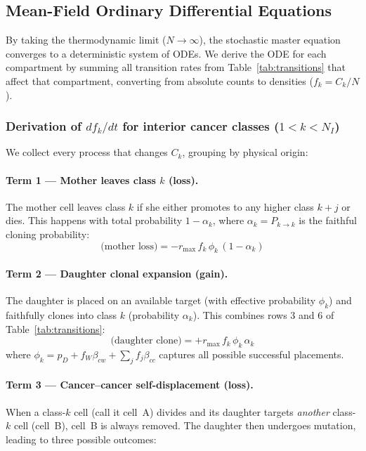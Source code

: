 \documentclass[11pt,a4paper]{article}
\begin{document}
\subsection{Mean-Field Ordinary Differential Equations}

By taking the thermodynamic limit ($N \to \infty$), the stochastic master equation converges to a deterministic system of ODEs. We derive the ODE for each compartment by summing all transition rates from Table~\ref{tab:transitions} that affect that compartment, converting from absolute counts to densities ($f_k = C_k/N$).

\subsubsection*{Derivation of $df_k/dt$ for interior cancer classes ($1 < k < N_I$)}

We collect every process that changes $C_k$, grouping by physical origin:

\paragraph{Term 1 --- Mother leaves class $k$ (loss).} The mother cell leaves class $k$ if she either promotes to any higher class $k+j$ or dies. This happens with total probability $1 - \alpha_k$, where $\alpha_k = P_{k \to k}$ is the faithful cloning probability:
\begin{equation}
    \text{(mother loss)} = -r_{\text{max}}\, f_k\, \phi_k\, (1 - \alpha_k)
\end{equation}

\paragraph{Term 2 --- Daughter clonal expansion (gain).} The daughter is placed on an available target (with effective probability $\phi_k$) and faithfully clones into class $k$ (probability $\alpha_k$). This combines rows 3 and 6 of Table~\ref{tab:transitions}:
\begin{equation}
    \text{(daughter clone)} = +r_{\text{max}}\, f_k\, \phi_k\, \alpha_k
\end{equation}
where $\phi_k = p_D + f_W \beta_{cw} + \sum_j f_j \beta_{cc}$ captures all possible successful placements.

\paragraph{Term 3 --- Cancer--cancer self-displacement (loss).} When a class-$k$ cell (call it cell~A) divides and its daughter targets \emph{another} class-$k$ cell (cell~B), cell~B is always removed. The daughter then undergoes mutation, leading to three possible outcomes:
\end{document}
